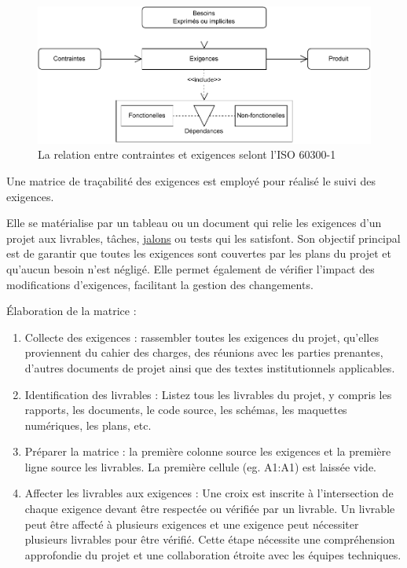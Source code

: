 \documentclass[a4paper,12pt]{article}
\begin{document}
\begin{figure}[htbp]
\centering
\includegraphics[width=.9\linewidth]{./svg/relation-contraintes-exigences.pdf}
\caption{\label{fig:orgcb644d9}La relation entre contraintes et exigences selont l'ISO 60300-1\autocite{GestionSureteFonctionnement2014}}
\end{figure}

Une matrice de traçabilité des exigences est employé pour réalisé le suivi des exigences.

Elle se matérialise par un tableau ou un document qui relie les exigences d'un projet aux livrables, tâches, \protect\hyperlink{gls-1}{\label{gls-1-use-1}jalons} ou tests qui les satisfont. Son objectif principal est de garantir que toutes les exigences sont couvertes par les plans du projet et qu'aucun besoin n'est négligé. Elle permet également de vérifier l'impact des modifications d'exigences, facilitant la gestion des changements.

Élaboration de la matrice :
\begin{enumerate}
\item Collecte des exigences : rassembler toutes les exigences du projet, qu'elles proviennent du cahier des charges, des réunions avec les parties prenantes, d'autres documents de projet ainsi que des textes institutionnels applicables.
\item Identification des livrables : Listez tous les livrables du projet, y compris les rapports, les documents, le code source, les schémas, les maquettes numériques, les plans, etc.
\item Préparer la matrice : la première colonne source les exigences et la première ligne source les livrables. La première cellule (eg. A1:A1) est laissée vide.
\item Affecter les livrables aux exigences : Une croix est inscrite à l'intersection de chaque exigence devant être respectée ou vérifiée par un livrable. Un livrable peut être affecté à plusieurs exigences et une exigence peut nécessiter plusieurs livrables pour être vérifié. Cette étape nécessite une compréhension approfondie du projet et une collaboration étroite avec les équipes techniques.
\end{enumerate}
\end{document}
